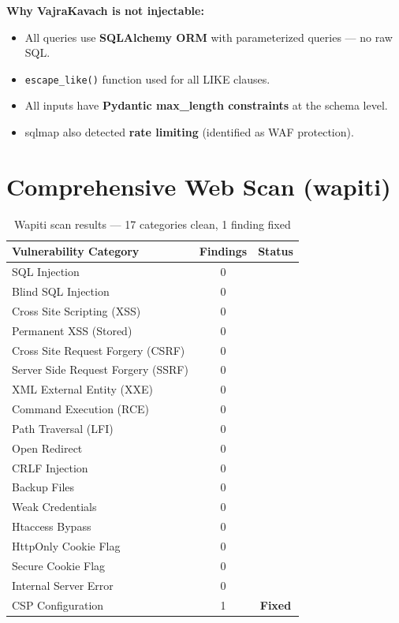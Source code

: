 \documentclass[12pt,a4paper]{article}
\newcommand{\pass}{\textcolor{success}{\checkmark}}
\newcommand{\fixd}{\textcolor{fixed}{\textbf{Fixed}}}
\begin{document}
\textbf{Why VajraKavach is not injectable:}
\begin{itemize}
  \item All queries use \textbf{SQLAlchemy ORM} with parameterized queries --- no raw SQL.
  \item \texttt{escape\_like()} function used for all LIKE clauses.
  \item All inputs have \textbf{Pydantic max\_length constraints} at the schema level.
  \item sqlmap also detected \textbf{rate limiting} (identified as WAF protection).
\end{itemize}

\section{Comprehensive Web Scan (wapiti)}

\begin{table}[H]
\centering
\begin{tabular}{lcc}
\toprule
\textbf{Vulnerability Category} & \textbf{Findings} & \textbf{Status} \\
\midrule
SQL Injection & 0 & \pass \\
Blind SQL Injection & 0 & \pass \\
Cross Site Scripting (XSS) & 0 & \pass \\
Permanent XSS (Stored) & 0 & \pass \\
Cross Site Request Forgery (CSRF) & 0 & \pass \\
Server Side Request Forgery (SSRF) & 0 & \pass \\
XML External Entity (XXE) & 0 & \pass \\
Command Execution (RCE) & 0 & \pass \\
Path Traversal (LFI) & 0 & \pass \\
Open Redirect & 0 & \pass \\
CRLF Injection & 0 & \pass \\
Backup Files & 0 & \pass \\
Weak Credentials & 0 & \pass \\
Htaccess Bypass & 0 & \pass \\
HttpOnly Cookie Flag & 0 & \pass \\
Secure Cookie Flag & 0 & \pass \\
Internal Server Error & 0 & \pass \\
\midrule
CSP Configuration & 1 & \fixd \\
\bottomrule
\end{tabular}
\caption{Wapiti scan results --- 17 categories clean, 1 finding fixed}
\end{table}
\end{document}
